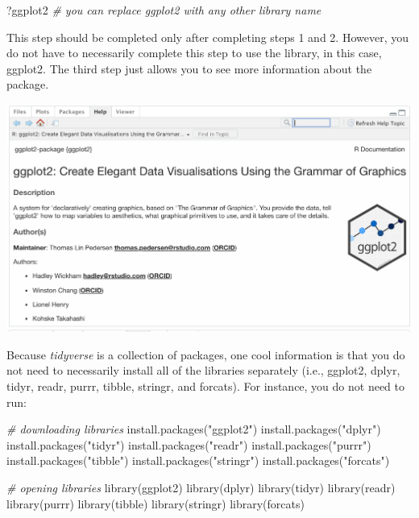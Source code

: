 \documentclass[
]{book}
\newenvironment{Shaded}{\begin{snugshade}}{\end{snugshade}}
\newcommand{\CommentTok}[1]{\textcolor[rgb]{0.56,0.35,0.01}{\textit{#1}}}
\newcommand{\FunctionTok}[1]{\textcolor[rgb]{0.00,0.00,0.00}{#1}}
\newcommand{\NormalTok}[1]{#1}
\newcommand{\StringTok}[1]{\textcolor[rgb]{0.31,0.60,0.02}{#1}}
\begin{document}
\begin{Shaded}
\begin{Highlighting}[]
\NormalTok{?ggplot2 }\CommentTok{\# you can replace ggplot2 with any other library name}
\end{Highlighting}
\end{Shaded}

This step should be completed only after completing steps 1 and 2. However, you do not have to necessarily complete this step to use the library, in this case, ggplot2. The third step just allows you to see more information about the package.

\includegraphics[width=1\linewidth]{images-figures/03-ggplot2}

Because \emph{tidyverse} is a collection of packages, one cool information is that you do not need to necessarily install all of the libraries separately (i.e., ggplot2, dplyr, tidyr, readr, purrr, tibble, stringr, and forcats). For instance, you do not need to run:

\begin{Shaded}
\begin{Highlighting}[]
\CommentTok{\# downloading libraries}
\FunctionTok{install.packages}\NormalTok{(}\StringTok{"ggplot2"}\NormalTok{)}
\FunctionTok{install.packages}\NormalTok{(}\StringTok{"dplyr"}\NormalTok{)}
\FunctionTok{install.packages}\NormalTok{(}\StringTok{"tidyr"}\NormalTok{)}
\FunctionTok{install.packages}\NormalTok{(}\StringTok{"readr"}\NormalTok{)}
\FunctionTok{install.packages}\NormalTok{(}\StringTok{"purrr"}\NormalTok{)}
\FunctionTok{install.packages}\NormalTok{(}\StringTok{"tibble"}\NormalTok{)}
\FunctionTok{install.packages}\NormalTok{(}\StringTok{"stringr"}\NormalTok{)}
\FunctionTok{install.packages}\NormalTok{(}\StringTok{"forcats"}\NormalTok{)}

\CommentTok{\# opening libraries}
\FunctionTok{library}\NormalTok{(ggplot2)}
\FunctionTok{library}\NormalTok{(dplyr)}
\FunctionTok{library}\NormalTok{(tidyr)}
\FunctionTok{library}\NormalTok{(readr)}
\FunctionTok{library}\NormalTok{(purrr)}
\FunctionTok{library}\NormalTok{(tibble)}
\FunctionTok{library}\NormalTok{(stringr)}
\FunctionTok{library}\NormalTok{(forcats)}
\end{Highlighting}
\end{Shaded}
\end{document}
